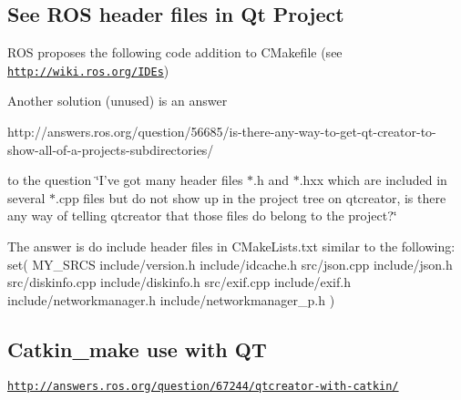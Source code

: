 \subsection*{See R\-O\-S header files in Qt Project }

R\-O\-S proposes the following code addition to C\-Makefile (see {\ttfamily \href{http://wiki.ros.org/IDEs}{\tt http\-://wiki.\-ros.\-org/\-I\-D\-Es}}) 


Another solution (unused) is an answer \begin{DoxyVerb}http://answers.ros.org/question/56685/is-there-any-way-to-get-qt-creator-to-show-all-of-a-projects-subdirectories/
\end{DoxyVerb}


to the question \char`\"{}\-I've got many header files $\ast$.\-h and $\ast$.\-hxx which are included in several $\ast$.\-cpp files but do not show up in the project tree on qtcreator, is there any way of telling qtcreator that those files do belong to the project?\char`\"{}

The answer is do include header files in C\-Make\-Lists.\-txt similar to the following\-: set( M\-Y\-\_\-\-S\-R\-C\-S include/version.\-h include/idcache.\-h src/json.\-cpp include/json.\-h src/diskinfo.\-cpp include/diskinfo.\-h src/exif.\-cpp include/exif.\-h include/networkmanager.\-h include/networkmanager\-\_\-p.\-h )

\subsection*{Catkin\-\_\-make use with Q\-T }

\href{http://answers.ros.org/question/67244/qtcreator-with-catkin/}{\tt http\-://answers.\-ros.\-org/question/67244/qtcreator-\/with-\/catkin/} 